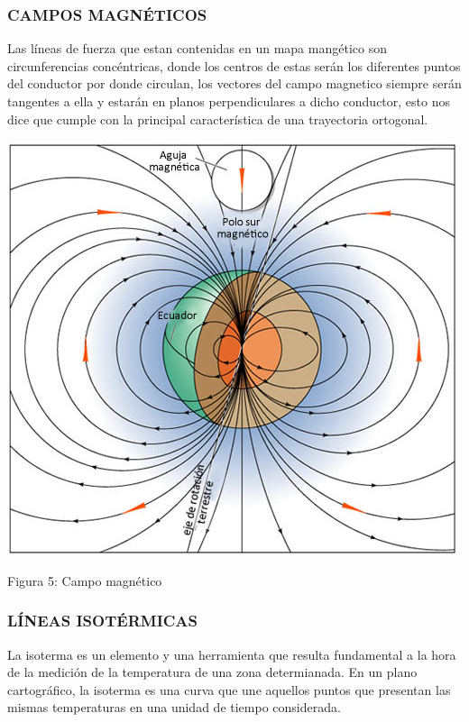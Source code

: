 \documentclass[12pt,letterpaper]{article}
\begin{document}
\begin{titlepage}
\begin{flushleft}

\subsubsection{CAMPOS MAGNÉTICOS}
Las líneas de fuerza que estan contenidas en un mapa mangético son circunferencias concéntricas, donde los centros de estas serán los diferentes puntos del conductor por donde circulan, los vectores del campo magnetico siempre serán tangentes a ella y estarán en planos perpendiculares a dicho conductor, esto nos dice que cumple con la principal característica de una trayectoria ortogonal.
\vspace{0.7cm}

\end{flushleft}
\centering
\includegraphics[scale=0.5]{Figura Campo magnetico}

Figura 5: Campo magnético

\begin{flushleft}


\subsubsection{LÍNEAS ISOTÉRMICAS}
La isoterma es un elemento y una herramienta que resulta fundamental a la hora de la medición de la temperatura de una zona determianada. En un plano cartográfico, la isoterma es una curva que une aquellos puntos que presentan las mismas temperaturas en una unidad de tiempo considerada.
\vspace{1cm}

\end{flushleft}
\end{titlepage}
\end{document}
